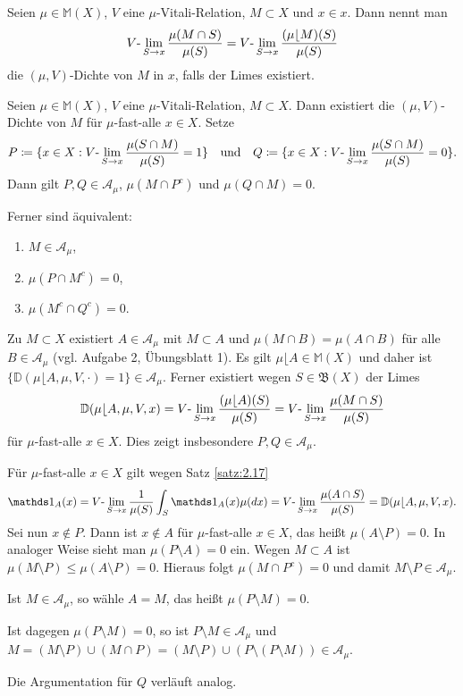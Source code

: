\documentclass[a4paper,twoside,DIV15,BCOR12mm]{scrbook}
\newcommand{\A}{\mathcal A}
\newcommand{\borel}{\mathfrak B}
\newcommand{\ind}{\mathds 1}
\newcommand{\MR}{\lfloor}
\begin{document}
\begin{definition}
Seien $\mu\in\mathbb M(X)$, $V$ eine $\mu$-Vitali-Relation, $M\subset X$ und $x\in x$. Dann nennt man
\[
V\text-\lim_{S\to x}\frac{\mu(M\cap S)}{\mu(S)} = V\text-\lim_{S\to x} \frac{(\mu\MR M)(S)}{\mu(S)}
\]
die $(\mu,V)$-Dichte von $M$ in $x$, falls der Limes existiert.
\end{definition}

\begin{satz}
\label{satz:2.18}
Seien $\mu\in\mathbb M(X)$, $V$ eine $\mu$-Vitali-Relation, $M\subset X$. Dann existiert die $(\mu,V)$-Dichte 
von $M$ für $\mu$-fast-alle $x\in X$. Setze
\[
P \da \{x\in X: V\text-\lim_{S\to x}\frac{\mu(S\cap M)}{\mu(S)} = 1\} \quad\text{und}\quad
Q \da \{x\in X: V\text-\lim_{S\to x}\frac{\mu(S\cap  M)}{\mu(S)} = 0\}.
\]
Dann gilt $P,Q\in\A_\mu$, $\mu(M\cap P^c)$ und $\mu(Q\cap M) =0$.

Ferner sind äquivalent:
\begin{enumerate}
\item $M\in \A_\mu$,
\item $\mu(P\cap M^c) = 0$,
\item $\mu(M^c\cap Q^c) = 0$.
\end{enumerate}
\end{satz}

\begin{beweis}
Zu $M\subset X$ existiert $A\in\A_\mu$ mit $M\subset A$ und $\mu(M\cap B) = \mu(A\cap B)$ für alle $B\in\A_\mu$ 
(vgl. Aufgabe 2, Übungsblatt 1). Es gilt $\mu\MR A\in\mathbb M(X)$ und daher ist $\{\mathbb D(\mu\MR A,\mu,V,\cdot)= 1\} \in \A_\mu$. Ferner existiert wegen $S\in\borel(X)$ der Limes
\[
\mathbb D(\mu\MR A, \mu, V, x) = V\text-\lim_{S\to x} \frac{(\mu\MR A)(S)}{\mu(S)} = V\text-\lim_{S\to x}\frac{\mu(M\cap S)}{\mu(S)} 
\]
für $\mu$-fast-alle $x\in X$. Dies zeigt insbesondere $P,Q\in\A_\mu$.

Für $\mu$-fast-alle $x\in X$ gilt wegen Satz \ref{satz:2.17} 
\[
\ind_A(x)  = V\text-\lim_{S\to x} \frac1{\mu(S)} \int_S \ind_A(x) \mu(dx) = V\text-\lim_{S\to x} \frac{\mu(A\cap S)}{\mu(S)} = \mathbb D(\mu\MR A,\mu,V,x).
\]
Sei nun $x\notin P$. Dann ist $x\notin A$ für $\mu$-fast-alle $x\in X$, das heißt $\mu(A\setminus P) = 0$. In  analoger Weise sieht man $\mu(P\setminus A)=0$ ein. Wegen $M\subset A$ ist $\mu(M\setminus P) \le \mu(A\setminus P) =0$. Hieraus folgt $\mu(M\cap P^c)=0$ und damit $M\setminus P\in\A_\mu$. 

Ist $M\in\A_\mu$, so wähle $A=M$, das heißt $\mu(P\setminus M)=0$. 

Ist  dagegen $\mu(P\setminus M)=0$, so ist $P\setminus M\in\A_\mu$ und $M=(M\setminus P) \cup (M\cap P) = (M\setminus P) \cup (P\setminus (P\setminus M)) \in \A_\mu$. 

Die Argumentation für $Q$ verläuft analog.
\end{beweis}
\end{document}
